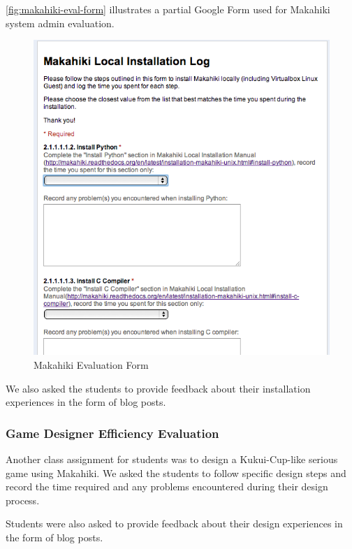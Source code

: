 \documentclass{sigchi}
\begin{document}
\autoref{fig:makahiki-eval-form} illustrates a partial Google Form
used for Makahiki system admin evaluation.

\begin{figure}[ht!]
   \centering
   \includegraphics[width=\columnwidth]{developer-eval-form}
   \caption{Makahiki Evaluation Form}
   \label{fig:makahiki-eval-form}
\end{figure}

We also asked the students to provide feedback about their
installation experiences in the form of blog posts.

\subsubsection{Game Designer Efficiency Evaluation}

Another class assignment for students was to design a Kukui-Cup-like
serious game using Makahiki. We asked the students to follow specific
design steps and record the time required and any problems encountered during
their design process.

Students were also asked to provide feedback about their design
experiences in the form of blog posts.
\end{document}
